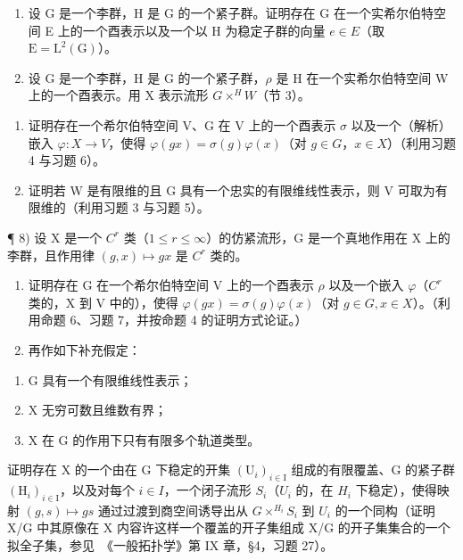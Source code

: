 \begin{enumerate}
\begin{enumerate}
\def\labelenumi{\arabic{enumi})}
\setcounter{enumi}{5}
\item
  设 G 是一个李群，H 是 G 的一个紧子群。证明存在 G 在一个实希尔伯特空间 E 上的一个酉表示以及一个以 H 为稳定子群的向量 \(e \in E\)（取 \(\mathrm{E} = \mathrm{L}^{2}(\mathrm{G})\)）。
\item
  设 G 是一个李群，H 是 G 的一个紧子群，\(\rho\) 是 H 在一个实希尔伯特空间 W 上的一个酉表示。用 X 表示流形 \(G \times ^{H}W\)（节 3）。
\end{enumerate}

\begin{enumerate}
\def\labelenumi{\alph{enumi})}
\item
  证明存在一个希尔伯特空间 V、G 在 V 上的一个酉表示 \(\sigma\) 以及一个（解析）嵌入 \(\varphi: X \to V\)，使得 \(\varphi(gx) = \sigma(g)\varphi(x)\)（对 \(g \in G\)，\(x \in X\)）（利用习题 4 与习题 6）。
\item
  证明若 W 是有限维的且 G 具有一个忠实的有限维线性表示，则 V 可取为有限维的（利用习题 3 与习题 5）。
\end{enumerate}

¶ 8) 设 X 是一个 \(C^{r}\) 类（\(1 \leq r \leq \infty\)）的仿紧流形，G 是一个真地作用在 X 上的李群，且作用律 \((g, x) \mapsto gx\) 是 \(C^{r}\) 类的。

\begin{enumerate}
\def\labelenumi{\alph{enumi})}
\item
  证明存在 G 在一个希尔伯特空间 V 上的一个酉表示 \(\rho\) 以及一个嵌入 \(\varphi\)（\(C^{r}\) 类的，X 到 V 中的），使得 \(\varphi(gx) = \sigma(g)\varphi(x)\)（对 \(g \in G, x \in X\)）。（利用命题 6、习题 7，并按命题 4 的证明方式论证。）
\item
  再作如下补充假定：
\end{enumerate}

\begin{enumerate}
\def\labelenumi{(\roman{enumi})}
\item
  G 具有一个有限维线性表示；
\item
  \(\mathrm{X}\) 无穷可数且维数有界；
\item
  X 在 G 的作用下只有有限多个轨道类型。
\end{enumerate}

证明存在 X 的一个由在 G 下稳定的开集 \((\mathrm{U}_{i})_{i\in\mathrm{I}}\) 组成的有限覆盖、G 的紧子群 \((\mathrm{H}_{i})_{i\in\mathrm{I}}\)，以及对每个 \(i\in I\)，一个闭子流形 \(S_{i}\)（\(U_{i}\) 的，在 \(H_{i}\) 下稳定），使得映射 \((g,s)\mapsto gs\) 通过过渡到商空间诱导出从 \(G\times^{H_{i}}S_{i}\) 到 \(U_{i}\) 的一个同构（证明 X/G 中其原像在 X 内容许这样一个覆盖的开子集组成 X/G 的开子集集合的一个拟全子集，参见~《一般拓扑学》第 IX 章，§4，习题 27）。


\end{enumerate}
